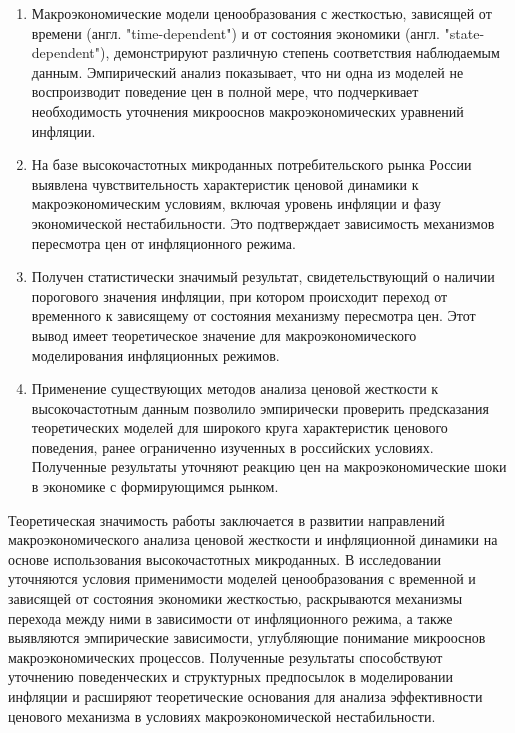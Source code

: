 {}
\begin{enumerate}[beginpenalty=10000] %
	\item Макроэкономические модели ценообразования с жесткостью, зависящей от времени (англ. "time-dependent") и от состояния экономики (англ. "state-dependent"), демонстрируют различную степень соответствия наблюдаемым данным. Эмпирический анализ показывает, что ни одна из моделей не воспроизводит поведение цен в полной мере, что подчеркивает необходимость уточнения микрооснов макроэкономических уравнений инфляции.
	
	\item На базе высокочастотных микроданных потребительского рынка России выявлена чувствительность характеристик ценовой динамики к макроэкономическим условиям, включая уровень инфляции и фазу экономической нестабильности. Это подтверждает зависимость механизмов пересмотра цен от инфляционного режима.
	
	\item Получен статистически значимый результат, свидетельствующий о наличии порогового значения инфляции, при котором происходит переход от временного к зависящему от состояния механизму пересмотра цен. Этот вывод имеет теоретическое значение для макроэкономического моделирования инфляционных режимов.
	
	\item Применение существующих методов анализа ценовой жесткости к высокочастотным данным позволило эмпирически проверить предсказания теоретических моделей для широкого круга характеристик ценового поведения, ранее ограниченно изученных в российских условиях. Полученные результаты уточняют реакцию цен на макроэкономические шоки в экономике с формирующимся рынком.
	
\end{enumerate}

{\theoreticalInfluence} Теоретическая значимость работы заключается в развитии направлений макроэкономического анализа ценовой жесткости и инфляционной динамики на основе использования высокочастотных микроданных. В исследовании уточняются условия применимости моделей ценообразования с временной и зависящей от состояния экономики жесткостью, раскрываются механизмы перехода между ними в зависимости от инфляционного режима, а также выявляются эмпирические зависимости, углубляющие понимание микрооснов макроэкономических процессов. Полученные результаты способствуют уточнению поведенческих и структурных предпосылок в моделировании инфляции и расширяют теоретические основания для анализа эффективности ценового механизма в условиях макроэкономической нестабильности.

